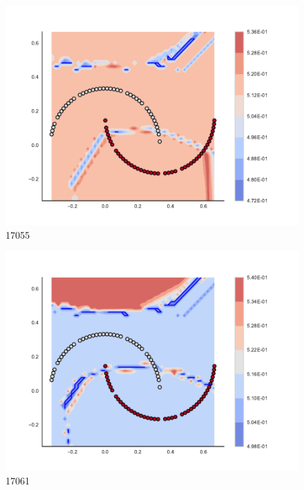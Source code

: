 \begin{subfigure}[b]{0.09\textwidth}
    \includegraphics[clip, trim=2.35cm 1.75cm 4.5cm 0cm,width=\textwidth]{img/convergence/17055.pdf}
    \caption{17055}
    \label{fig:convergence_17055}
\end{subfigure}
%
\begin{subfigure}[b]{0.09\textwidth}
    \includegraphics[clip, trim=2.35cm 1.75cm 4.5cm 0cm,width=\textwidth]{img/convergence/17061.pdf}
    \caption{17061}
    \label{fig:convergence_17061}
\end{subfigure}
%

